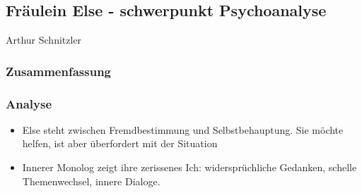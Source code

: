 

\subsection{Fräulein Else - schwerpunkt Psychoanalyse}
\label{sec:frauleinelse}
 Arthur Schnitzler

\subsubsection{Zusammenfassung}

\subsubsection{Analyse}

\begin{itemize}
    \item Else steht zwischen Fremdbestimmung und Selbstbehauptung. Sie möchte helfen, ist aber überfordert mit der Situation
    \item Innerer Monolog zeigt ihre zerissenes Ich: widersprüchliche Gedanken, schelle Themenwechsel, innere Dialoge.
\end{itemize}

